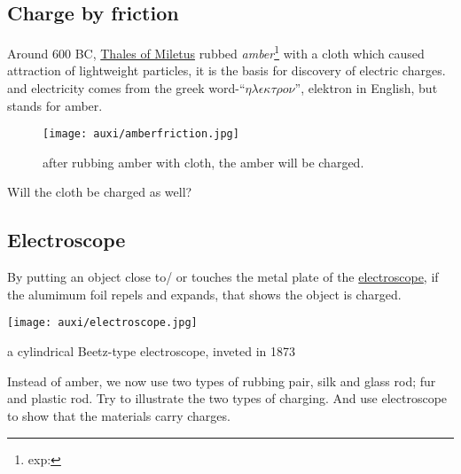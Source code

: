 \documentclass[a4paper]{tufte-handout}
\newenvironment{TaskBox} %
{\begin{tcolorbox}[breakable,colback=b1!30,colframe=b1,title=Task]} {\end{tcolorbox}}
\begin{document}
\subsection{Charge by friction}
Around 600 BC, \href{https://www.britannica.com/biography/Thales-of-Miletus}{Thales of Miletus} rubbed \emph{amber}\footnote{exp:} with a cloth which caused attraction of lightweight particles, it is the basis for discovery of electric charges. and electricity comes from the greek word-``$\eta\lambda\epsilon\kappa\tau\rho o\nu$'', elektron in English, but stands for amber. 
\begin{figure}[h]
\texttt{[image: auxi/amberfriction.jpg]}
\caption{after rubbing amber with cloth, the amber will be charged.}
\end{figure}
\begin{TaskBox}
Will the cloth be charged as well?
\end{TaskBox}

\subsection{Electroscope}
By putting an object close to/ or touches the metal plate of the \href{https://orau.org/health-physics-museum/collection/electroscopes/electrostatic/beetz-cylindrical.html}{electroscope}, if the alumimum foil repels and expands, that shows the object is charged.
\begin{marginfigure}
\texttt{[image: auxi/electroscope.jpg]}
\caption{a cylindrical Beetz-type electroscope, inveted in 1873}
\end{marginfigure}

\begin{TaskBox}
Instead of amber, we now use two types of rubbing pair, silk and glass rod; fur and plastic rod. Try to illustrate the two types of charging. And use electroscope to show that the materials carry charges. 
\end{TaskBox}
\end{document}
